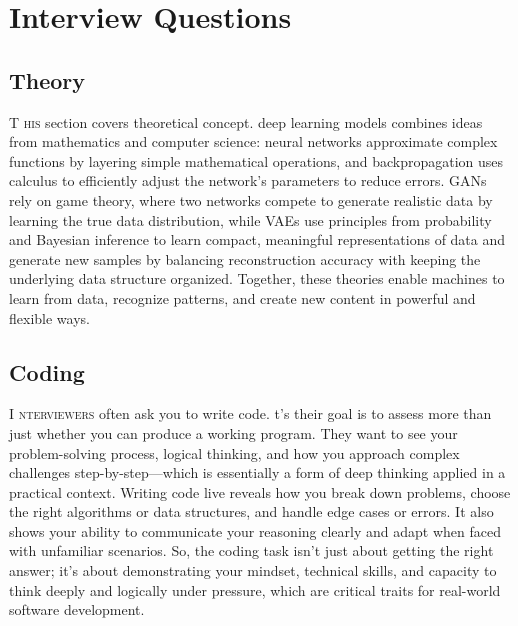 \documentclass{book}
\begin{document}
\chapter{Interview Questions}

\section{Theory}
\lettrine{T}{ his} section covers theoretical concept. deep learning models combines ideas from mathematics and computer science: neural networks approximate complex functions by layering simple mathematical operations, and backpropagation uses calculus to efficiently adjust the network’s parameters to reduce errors. GANs rely on game theory, where two networks compete to generate realistic data by learning the true data distribution, while VAEs use principles from probability and Bayesian inference to learn compact, meaningful representations of data and generate new samples by balancing reconstruction accuracy with keeping the underlying data structure organized. Together, these theories enable machines to learn from data, recognize patterns, and create new content in powerful and flexible ways.

\section{Coding}
\lettrine{I}{ nterviewers} often ask you to write code. t’s their goal is to assess more than just whether you
can produce a working program. They want to see your problem-solving process, logical thinking,
and how you approach complex challenges step-by-step—which is essentially a form of deep thinking
applied in a practical context. Writing code live reveals how you break down problems, choose the right
algorithms or data structures, and handle edge cases or errors. It also shows your ability to communicate
your reasoning clearly and adapt when faced with unfamiliar scenarios. So, the coding task isn’t just
about getting the right answer; it’s about demonstrating your mindset, technical skills, and capacity to
think deeply and logically under pressure, which are critical traits for real-world software development.
\end{document}
